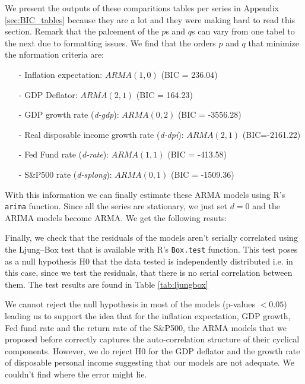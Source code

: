 \documentclass[hidelinks,12pts]{article}
\DeclareMathOperator{\1}{\mathbbm{1}}
\begin{document}
We present the outputs of these comparitions tables per series in Appendix \ref{sec:BIC_tables} because they are a lot and they were making hard to read this section. 
Remark that the palcement of the $p$s and $q$s can vary from one tabel to the next due to formatting issues. 
We find that the orders $p$ and $q$ that minimize the nformation criteria are: 
    \begin{itemize}
        \item[-] Inflation expectation: $ARMA(1,0)$ (BIC = $236.04$)
        \item[-] GDP Deflator: $ARMA(2,1)$ (BIC = 164.23)  
        \item[-] GDP growth rate (\emph{d-gdp}): $ARMA(0,2)$ (BIC = -3556.28)
        \item[-] Real disposable income growth rate (\emph{d-dpi}): $ARMA(2,1)$ (BIC=-2161.22)
        \item[-] Fed Fund rate (\emph{d-rate}): $ARMA(1,1)$ (BIC = -413.58)
        \item[-] S\&P500 rate (\emph{d-splong}): $ARMA(0,1)$ (BIC = -1509.36)
    \end{itemize}

With this information we can finally estimate these ARMA models using R's \texttt{arima} function. 
Since all the series are stationary, we just set $d=0$ and the ARIMA models become ARMA. 
We get the following resuts: 


Finally, we check that the residuals of the models aren't serially correlated using the Ljung–Box test that is available with R's \texttt{Box.test} function.
This test poses as a null hypothesis H0 that the data tested is independently distributed i.e. in this case, since we test the residuals, that there is no serial correlation between them.
The test results are found in Table \ref{tab:ljungbox}



We cannot reject the null hypothesis in most of the models (p-values $< 0.05$) leading us to support the idea that for the inflation expectation, GDP growth, Fed fund rate and the return rate of the S\&P500, the ARMA models that we proposed before correctly captures the auto-correlation structure of their cyclical components.
However, we do reject H0 for the GDP deflator and the growth rate of disposable personal income suggesting that our models are not adequate. 
We couldn't find where the error might lie. 
\end{document}
